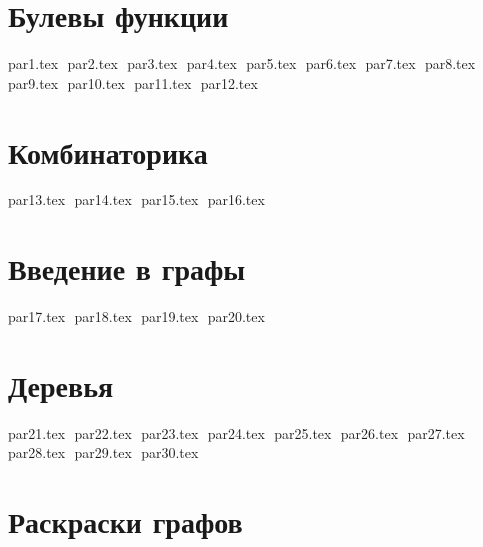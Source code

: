 



\gdef\CourseName{Дискретная математика}
\author{Лектор: Пузынина Светлана Александровна} 
\date{}

\makefirstpages

\section*{Булевы функции}

{par1.tex}
$ $
{par2.tex}
$ $
{par3.tex}
$ $
{par4.tex}
$ $
{par5.tex}
$ $
{par6.tex}
$ $
{par7.tex}
$ $
{par8.tex}
$ $
{par9.tex}
$ $
{par10.tex}
$ $
{par11.tex}
$ $
{par12.tex}
$ $
\pagebreak

\section*{Комбинаторика}

{par13.tex}
$ $
{par14.tex}
$ $
{par15.tex}
$ $
{par16.tex}
$ $
\pagebreak

\section*{Введение в графы}

{par17.tex}
$ $
{par18.tex}
$ $
{par19.tex}
$ $
{par20.tex}
$ $
\pagebreak

\section*{Деревья}

{par21.tex}
$ $
{par22.tex}
$ $
{par23.tex}
$ $
{par24.tex}
$ $
{par25.tex}
$ $
{par26.tex}
$ $
{par27.tex}
$ $
{par28.tex}
$ $
{par29.tex}
$ $
{par30.tex}
$ $
\pagebreak

\section*{Раскраски графов}

